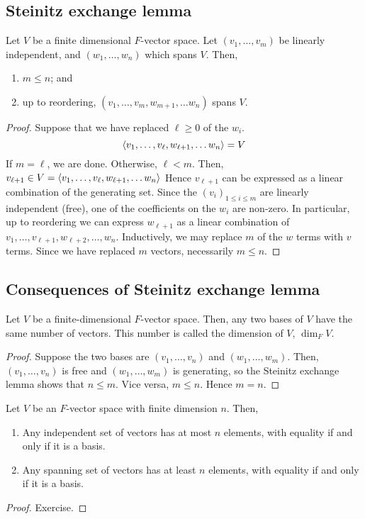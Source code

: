 \subsection{Steinitz exchange lemma}
\begin{theorem}
	Let \( V \) be a finite dimensional \( F \)-vector space.
	Let \( (v_1, \dots, v_m) \) be linearly independent, and \( (w_1, \dots, w_n) \) which spans \( V \).
	Then,
	\begin{enumerate}
		\item \( m \leq n \); and
		\item up to reordering, \( (v_1, \dots, v_m, w_{m+1}, \dots w_n) \) spans \( V \).
	\end{enumerate}
\end{theorem}
\begin{proof}
	Suppose that we have replaced \( \ell \geq 0 \) of the \( w_i \).
	\[
		\langle{} v_1, \dots, v_\ell, w_{\ell+1}, \dots w_n \rangle = V
	\]
	If \( m = \ell \), we are done.
	Otherwise, \( \ell < m \).
	Then,
	\( v_{\ell + 1} \in V = \langle{} v_1, \dots, v_\ell, w_{\ell+1}, \dots w_n \rangle \)
	Hence \( v_{\ell + 1} \) can be expressed as a linear combination of the generating set.
	Since the \( (v_i)_{1 \leq i \leq m} \) are linearly independent (free), one of the coefficients on the \( w_i \) are non-zero.
	In particular, up to reordering we can express \( w_{\ell+1} \) as a linear combination of \( v_1, \dots, v_{\ell + 1}, w_{\ell + 2}, \dots, w_n \).
	Inductively, we may replace \( m \) of the \( w \) terms with \( v \) terms.
	Since we have replaced \( m \) vectors, necessarily \( m \leq n \).
\end{proof}

\subsection{Consequences of Steinitz exchange lemma}
\begin{corollary}
	Let \( V \) be a finite-dimensional \( F \)-vector space.
	Then, any two bases of \( V \) have the same number of vectors.
	This number is called the dimension of \( V \), \( \dim_F V \).
\end{corollary}
\begin{proof}
	Suppose the two bases are \( (v_1, \dots, v_n) \) and \( (w_1, \dots, w_m) \).
	Then, \( (v_1, \dots, v_n) \) is free and \( (w_1, \dots, w_m) \) is generating, so the Steinitz exchange lemma shows that \( n \leq m \).
	Vice versa, \( m \leq n \).
	Hence \( m = n \).
\end{proof}
\begin{corollary}
	Let \( V \) be an \( F \)-vector space with finite dimension \( n \).
	Then,
	\begin{enumerate}
		\item Any independent set of vectors has at most \( n \) elements, with equality if and only if it is a basis.
		\item Any spanning set of vectors has at least \( n \) elements, with equality if and only if it is a basis.
	\end{enumerate}
\end{corollary}
\begin{proof}
	Exercise.
\end{proof}

